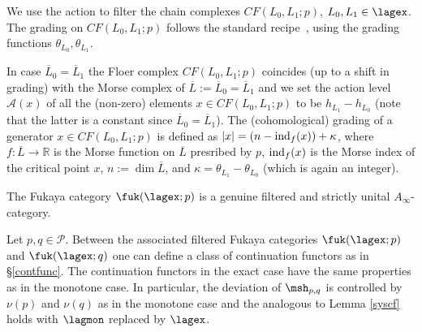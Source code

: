 We use the action to filter the chain complexes $CF(L_0, L_1; p)$,
$L_0, L_1 \in \lagex$. The grading on $CF(L_0, L_1;p)$ follows the
standard recipe~\cite{Se:graded}, using the grading functions
$\theta_{L_0}, \theta_{L_1}$.

In case $\overline{L}_0 = \overline{L}_1$ the Floer complex
$CF(L_0, L_1; p)$ coincides (up to a shift in grading) with the Morse
complex of $\overline{L}:= \overline{L}_0 = \overline{L}_1$ and we set
the action level $\mathcal{A}(x)$ of all the (non-zero) elements
$x \in CF(L_0, L_1; p)$ to be $h_{L_1} - h_{L_0}$ (note that the
latter is a constant since $\overline{L}_0 = \overline{L}_1$). The
(cohomological) grading of a generator $x \in CF(L_0, L_1; p)$ is
defined as $|x| = (n- \textnormal{ind}_f(x)) + \kappa$, where
$f: \overline{L} \longrightarrow \mathbb{R}$ is the Morse function on
$\overline{L}$ presribed by $p$, $\textnormal{ind}_f(x)$ is the Morse
index of the critical point $x$, $n := \dim \overline{L}$, and
$\kappa = \theta_{L_1} - \theta_{L_0}$ (which is again an integer).

The Fukaya category $\fuk(\lagex;p)$ is a genuine
filtered and strictly unital $A_{\infty}$-category. 

Let $p,q\in \mathcal{P}$. Between the associated filtered Fukaya categories $\fuk(\lagex;p)$ and $\fuk(\lagex;q)$ one can define a class of continuation functors as in \S\ref{contfunc}. The continuation functors in the exact case have the same properties as in the monotone case. In particular, the deviation of $\msh_{p,q}$ is controlled by $\nu(p)$ and $\nu(q)$ as in the monotone case and the analogous to Lemma \ref{syscf} holds with $\lagmon$ replaced by $\lagex$.


